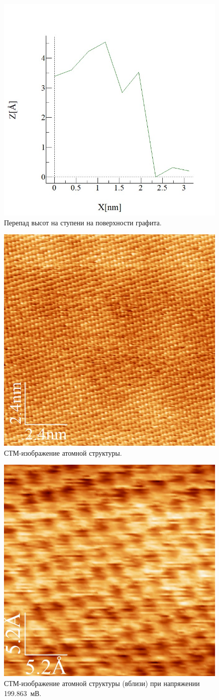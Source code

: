 \documentclass[a4paper, 12pt]{article}
\begin{document}
\begin{figure}[H]
	\centering
	\includegraphics[width=0.6\linewidth]{2_step_anal}
	\caption{Перепад высот на ступени на поверхности графита.}
	\label{fig:2_step_anal}
\end{figure}

\begin{figure}[H]
	\centering
	\includegraphics[width=0.6\linewidth]{2_small_atoms}
	\caption{СТМ-изображение атомной структуры.}
	\label{fig:2_small_atoms}
\end{figure}

\begin{figure}[H]
	\centering
	\includegraphics[width=0.6\linewidth]{2_big_atoms}
	\caption{СТМ-изображение атомной структуры (вблизи) при напряжении 199.863~мВ.}
	\label{fig:2_big_atoms}
\end{figure}
\end{document}
